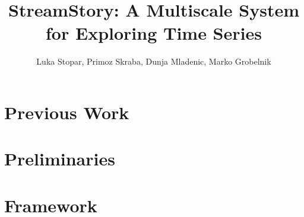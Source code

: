 \documentclass[journal]{vgtc}                %
\title{StreamStory: A Multiscale System for Exploring Time Series}
\author{Luka Stopar, Primoz Skraba, Dunja Mladenic, Marko Grobelnik}
\theoremstyle{definition}
\begin{document}

\maketitle

\label{sec:introduction}





\section{Previous Work}
\label{sec:previous}


\section{Preliminaries}


\section{Framework}
\label{sec:multiscale-framework}

\end{document}
